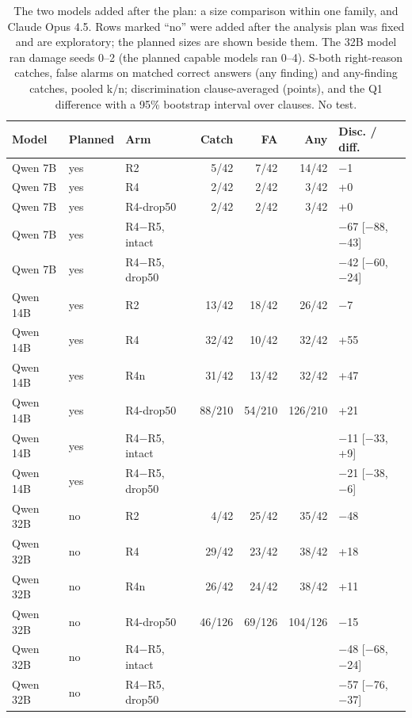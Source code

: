 \begin{table}[t]\centering\small
\caption{The two models added after the plan: a size comparison within one family, and Claude Opus 4.5. Rows marked ``no'' were added after the analysis plan was fixed and are exploratory; the planned sizes are shown beside them. The 32B model ran damage seeds 0--2 (the planned capable models ran 0--4). S-both right-reason catches, false alarms on matched correct answers (any finding) and any-finding catches, pooled k/n; discrimination clause-averaged (points), and the Q1 difference with a 95\% bootstrap interval over clauses. No test.}
\label{tab:exploratory}
\footnotesize\setlength{\tabcolsep}{3pt}
\begin{tabular}{lllrrrl}
\toprule
Model & Planned & Arm & Catch & FA & Any & Disc. / diff. \\
\midrule
Qwen 7B & yes & R2 & 5/42 & 7/42 & 14/42 & $-$1 \\
Qwen 7B & yes & R4 & 2/42 & 2/42 & 3/42 & +0 \\
Qwen 7B & yes & R4-drop50 & 2/42 & 2/42 & 3/42 & +0 \\
Qwen 7B & yes & R4$-$R5, intact & \multicolumn{3}{c}{} & $-$67 [$-$88, $-$43] \\
Qwen 7B & yes & R4$-$R5, drop50 & \multicolumn{3}{c}{} & $-$42 [$-$60, $-$24] \\
\addlinespace
Qwen 14B & yes & R2 & 13/42 & 18/42 & 26/42 & $-$7 \\
Qwen 14B & yes & R4 & 32/42 & 10/42 & 32/42 & +55 \\
Qwen 14B & yes & R4n & 31/42 & 13/42 & 32/42 & +47 \\
Qwen 14B & yes & R4-drop50 & 88/210 & 54/210 & 126/210 & +21 \\
Qwen 14B & yes & R4$-$R5, intact & \multicolumn{3}{c}{} & $-$11 [$-$33, +9] \\
Qwen 14B & yes & R4$-$R5, drop50 & \multicolumn{3}{c}{} & $-$21 [$-$38, $-$6] \\
\addlinespace
Qwen 32B & no & R2 & 4/42 & 25/42 & 35/42 & $-$48 \\
Qwen 32B & no & R4 & 29/42 & 23/42 & 38/42 & +18 \\
Qwen 32B & no & R4n & 26/42 & 24/42 & 38/42 & +11 \\
Qwen 32B & no & R4-drop50 & 46/126 & 69/126 & 104/126 & $-$15 \\
Qwen 32B & no & R4$-$R5, intact & \multicolumn{3}{c}{} & $-$48 [$-$68, $-$24] \\
Qwen 32B & no & R4$-$R5, drop50 & \multicolumn{3}{c}{} & $-$57 [$-$76, $-$37] \\

\end{tabular}
\end{table}
